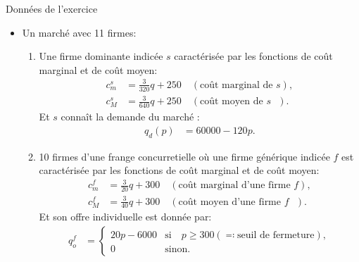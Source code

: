 \begin{frame}
  [allowframebreaks]{Données de l'exercice}
  \begin{itemize}
\item Un marché avec 11 firmes:
\begin{enumerate}[$\cdot$]
\item Une firme dominante indicée $s$ caractérisée par les fonctions de coût marginal et de coût moyen:
\begin{align}
c_m^s &= \frac{3}{320}q + 250 \quad (\text{coût marginal de $s$}) \label{eq1},\\
c_M^s &= \frac{3}{640}q + 250 \quad (\text{coût moyen de $s$ })\label{eq2}.
\end{align}
Et $s$ connaît la demande du marché :
\begin{align}
q_d(p) &= 60000 - 120p.\label{eq3}
\end{align}
\item 10 firmes d'une frange concurretielle où une firme générique indicée $f$ est caractérisée par les fonctions de coût marginal et de coût moyen:
\begin{align}
c_m^f &= \frac{3}{20}q + 300 \quad (\text{coût marginal d'une firme $f$}) \label{eq4},\\
c_M^f &= \frac{3}{40}q + 300 \quad (\text{coût moyen d'une firme  $f$ })\label{eq5}.
\end{align}
Et son offre individuelle est donnée par:
\begin{align}
q_o^f &= \left\{
\begin{array}{ll}
20p-6000 & \text{si} \quad p\geq 300 (\eqqcolon \text{seuil de fermeture}), \\
0 & \text{sinon}.
\end{array}\right.
\label{eq6}
\end{align}
\end{enumerate}
\end{itemize}
\end{frame}

